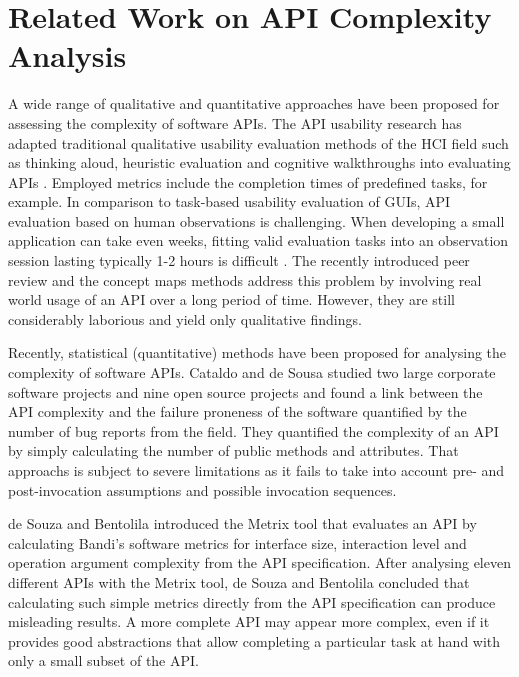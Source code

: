 \documentclass[conference]{IEEEtran}
\begin{document}
\section{Related Work on API Complexity Analysis%
  \label{related-work-on-api-complexity-analysis}%
}

A wide range of qualitative and quantitative approaches have been
proposed for assessing the complexity of software APIs. The API
usability research has adapted traditional qualitative usability
evaluation methods of the HCI field such as thinking aloud, heuristic
evaluation and cognitive walkthroughs into evaluating APIs
\cite{overview}. Employed metrics include the completion times of
predefined tasks, for example. In comparison to task-based usability
evaluation of GUIs, API evaluation based on human observations is
challenging. When developing a small application can take even weeks,
fitting valid evaluation tasks into an observation session lasting
typically 1-2 hours is difficult \cite{conceptmaps}. The recently
introduced peer review \cite{apipeerreview} and the concept maps
\cite{conceptmaps} methods address this problem by involving real world
usage of an API over a long period of time. However, they are still
considerably laborious and yield only qualitative findings.

Recently, statistical (quantitative) methods have been proposed for
analysing the complexity of software APIs. Cataldo and de Sousa
\cite{cmu-api_failures} studied two large corporate software projects
and nine open source projects and found a link between the API
complexity and the failure proneness of the software quantified by the
number of bug reports from the field. They quantified the complexity
of an API by simply calculating the number of public methods and
attributes. That approachs is subject to severe limitations as it
fails to take into account pre- and post-invocation assumptions and
possible invocation sequences.

de Souza and Bentolila \cite{automatic-api-eval} introduced the Metrix tool
that evaluates an API by calculating Bandi’s software metrics for
interface size, interaction level and operation argument complexity
from the API specification. After analysing eleven different APIs with
the Metrix tool, de Souza and Bentolila concluded that calculating
such simple metrics directly from the API specification can produce
misleading results. A more complete API may appear more complex, even
if it provides good abstractions that allow completing a particular
task at hand with only a small subset of the API.
\end{document}
